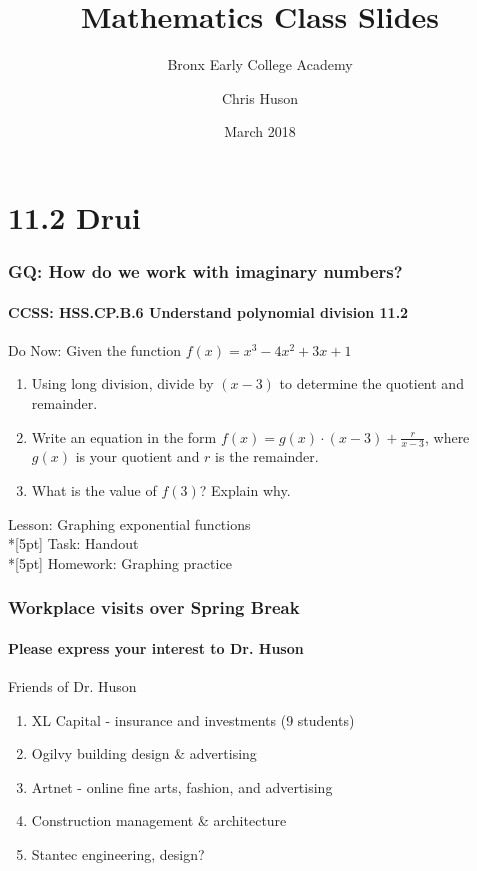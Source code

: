 \documentclass{beamer}
\title{Mathematics Class Slides}
\subtitle{Bronx Early College Academy}
\author{Chris Huson}
\date{March 2018}
\begin{document}
\frame{\titlepage}


\section{11.2 Drui}
\frame
{
  \frametitle{GQ: How do we work with imaginary numbers?}
  \framesubtitle{CCSS: HSS.CP.B.6 Understand polynomial division \qquad \qquad \qquad \alert{11.2}}

  \begin{block}{Do Now: Given the function $f(x)=x^3-4x^2+3x+1$}
    \begin{enumerate}
    \item Using long division, divide by $(x-3)$ to determine the quotient and remainder.
    \item Write an equation in the form $\displaystyle f(x)=g(x) \cdot (x-3)+ \frac{r}{x-3}$, where $g(x)$ is your quotient and $r$ is the remainder.
    \item What is the value of $f(3)$? Explain why.
    \end{enumerate}
  \end{block}
  Lesson: Graphing exponential functions\\*[5pt]
  Task: Handout\\*[5pt]
  Homework: Graphing practice
}

\frame
{
  \frametitle{Workplace visits over Spring Break}
    \framesubtitle{Please express your interest to Dr. Huson}
    \begin{block}{Friends of Dr. Huson} 
        \begin{enumerate}
            \item XL Capital - insurance and investments (9 students)
            \item Ogilvy building design \& advertising
            \item Artnet - online fine arts, fashion, and advertising
            \item Construction management \& architecture
            \item Stantec engineering, design?
        \end{enumerate}
    \end{block}
}
\end{document}
